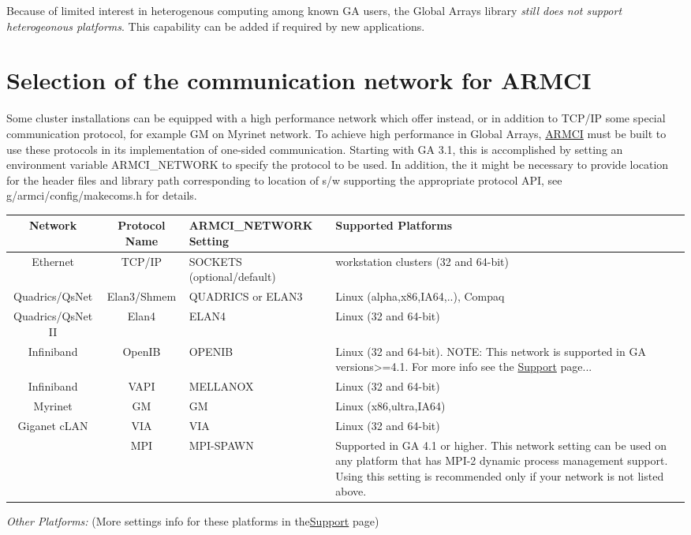 Because of limited interest in heterogenous computing among known
GA users, the Global Arrays library \emph{still does not support heterogeonous
platforms}. This capability can be added if required by new applications. 


\section{Selection of the communication network for ARMCI }

Some cluster installations can be equipped with a high performance
network which offer instead, or in addition to TCP/IP some special
communication protocol, for example GM on Myrinet network. To achieve
high performance in Global Arrays, \href{http://www.emsl.pnl.gov/docs/parsoft/armci}{ARMCI}
must be built to use these protocols in its implementation of one-sided
communication. Starting with GA 3.1, this is accomplished by setting
an environment variable ARMCI\_NETWORK to specify the protocol to
be used. In addition, the it might be necessary to provide location
for the header files and library path corresponding to location of
s/w supporting the appropriate protocol API, see g/armci/config/makecoms.h
for details. 

\begin{tabular}{|c|c|>{\centering}p{3cm}|>{\centering}p{3cm}|}
\hline 
Network & Protocol Name & ARMCI\_NETWORK Setting & Supported Platforms\tabularnewline
\hline
\hline 
Ethernet & TCP/IP & SOCKETS (optional/default) & workstation clusters (32 and 64-bit)\tabularnewline
\hline 
Quadrics/QsNet & Elan3/Shmem & QUADRICS or ELAN3 & Linux (alpha,x86,IA64,..), Compaq \tabularnewline
\hline 
Quadrics/QsNet II & Elan4 & ELAN4 & Linux (32 and 64-bit) \tabularnewline
\hline 
Infiniband & OpenIB & OPENIB & Linux (32 and 64-bit). NOTE: This network is supported in GA versions>=4.1.
For more info see the \href{http://www.emsl.pnl.gov/docs/global/support.html}{Support}
page...\tabularnewline
\hline 
Infiniband & VAPI & MELLANOX & Linux (32 and 64-bit)\tabularnewline
\hline 
Myrinet & GM & GM & Linux (x86,ultra,IA64)\tabularnewline
\hline 
Giganet cLAN & VIA & VIA & Linux (32 and 64-bit)\tabularnewline
\hline 
 & MPI & MPI-SPAWN & Supported in GA 4.1 or higher. This network setting can be used on
any platform that has MPI-2 dynamic process management support. Using
this setting is recommended only if your network is not listed above.\tabularnewline
\hline
\end{tabular}

\emph{Other Platforms:} (More settings info for these platforms in
the\href{http://www.emsl.pnl.gov/docs/global/support.html}{Support}
page) 

